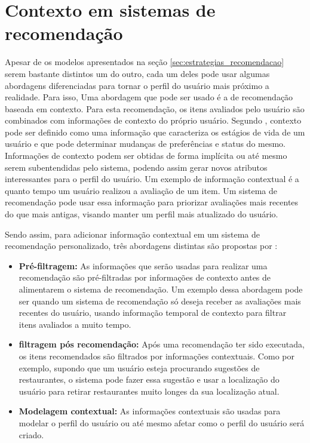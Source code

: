\section{Contexto em sistemas de recomendação}

Apesar de os modelos apresentados na seção \ref{sec:estrategias_recomendacao}
serem bastante distintos um do outro, cada um deles pode usar algumas
abordagens diferenciadas para tornar o perfil do usuário mais próximo a
realidade. Para isso, Uma abordagem que pode ser usado é a de recomendação
baseada em contexto. Para esta recomendação, os itens avaliados pelo usuário são
combinados com informações de contexto do próprio usuário. Segundo \cite{berry1997data},
contexto pode ser definido como uma informação que caracteriza os estágios de
vida de um usuário e que pode determinar mudanças de preferências e status
do mesmo. Informações de contexto podem ser obtidas de forma implícita ou até
mesmo serem subentendidas pelo sistema, podendo assim gerar novos atributos
interessantes para o perfil do usuário. Um exemplo de informação contextual é a
quanto tempo um usuário realizou a avaliação de um item. Um sistema de
recomendação pode usar essa informação para priorizar avaliações mais recentes
do que mais antigas, visando manter um perfil mais atualizado do usuário.

Sendo assim, para adicionar informação contextual em um sistema de recomendação
personalizado, três abordagens distintas são propostas por
:

\begin{itemize}
    \item \textbf{Pré-filtragem: } As informações que serão usadas
        para realizar uma recomendação são pré-filtradas por informações de
        contexto antes de alimentarem o sistema de recomendação. Um exemplo
        dessa abordagem pode ser quando um sistema de recomendação só deseja
        receber as avaliações mais recentes do usuário, usando informação
        temporal de contexto para filtrar itens avaliados a muito tempo.
    \item \textbf{filtragem pós recomendação: } Após uma recomendação ter sido
        executada, os itens recomendados são filtrados por informações
        contextuais. Como por exemplo, supondo que um usuário esteja procurando
        sugestões de restaurantes, o sistema pode fazer essa sugestão e usar a
        localização do usuário para retirar restaurantes muito longes da sua
        localização atual.
    \item \textbf{Modelagem contextual: } As informações contextuais são usadas
        para modelar o perfil do usuário ou até mesmo afetar como o perfil do
        usuário será criado.
\end{itemize}

